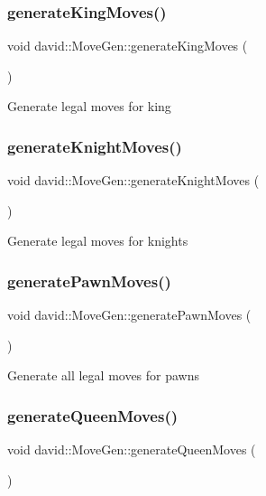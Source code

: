 \subsubsection{\texorpdfstring{generate\+King\+Moves()}{generateKingMoves()}}
{\footnotesize\ttfamily void david\+::\+Move\+Gen\+::generate\+King\+Moves (\begin{DoxyParamCaption}{ }\end{DoxyParamCaption})}

Generate legal moves for king \mbox{\label{classdavid_1_1MoveGen_a19c96f5c67ae7c5ca466f6a4dada6343}} 
\subsubsection{\texorpdfstring{generate\+Knight\+Moves()}{generateKnightMoves()}}
{\footnotesize\ttfamily void david\+::\+Move\+Gen\+::generate\+Knight\+Moves (\begin{DoxyParamCaption}{ }\end{DoxyParamCaption})}

Generate legal moves for knights \mbox{\label{classdavid_1_1MoveGen_a4e521a22effe648f7efe62d147cdd29f}} 
\subsubsection{\texorpdfstring{generate\+Pawn\+Moves()}{generatePawnMoves()}}
{\footnotesize\ttfamily void david\+::\+Move\+Gen\+::generate\+Pawn\+Moves (\begin{DoxyParamCaption}{ }\end{DoxyParamCaption})}

Generate all legal moves for pawns \mbox{\label{classdavid_1_1MoveGen_a333ddcfe5d1f26d9edf631229bf6edbf}} 
\subsubsection{\texorpdfstring{generate\+Queen\+Moves()}{generateQueenMoves()}}
{\footnotesize\ttfamily void david\+::\+Move\+Gen\+::generate\+Queen\+Moves (\begin{DoxyParamCaption}{ }\end{DoxyParamCaption})}

